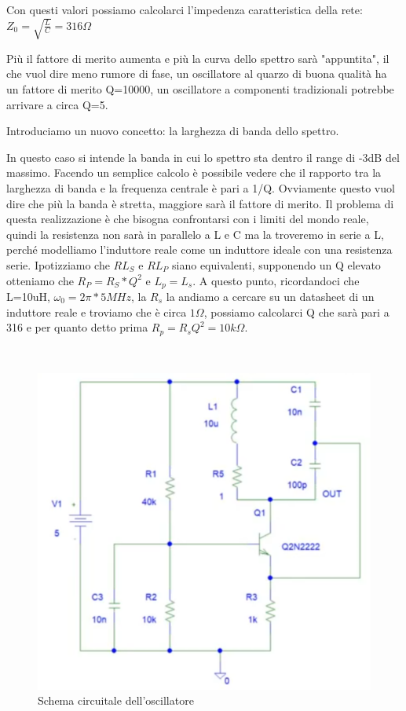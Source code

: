\documentclass{article}
\begin{document}
Con questi valori possiamo calcolarci l'impedenza caratteristica della rete:
\Large$Z_0=\sqrt{\frac{L}{C}}=316\Omega$\normalsize
\centering

Più il fattore di merito aumenta e più la curva dello spettro sarà "appuntita", il che vuol dire meno rumore di fase, un oscillatore al quarzo di buona qualità ha un fattore di merito Q=10000, un oscillatore a componenti tradizionali potrebbe arrivare a circa Q=5.

Introduciamo un nuovo concetto: la larghezza di banda dello spettro.

In questo caso si intende la banda in cui lo spettro sta dentro il range di -3dB del massimo.
Facendo un semplice calcolo è possibile vedere che il rapporto tra la larghezza di banda e la frequenza centrale è pari a 1/Q.
Ovviamente questo vuol dire che più la banda è stretta, maggiore sarà il fattore di merito.
Il problema di questa realizzazione è che bisogna confrontarsi con i limiti del mondo reale, quindi la resistenza non sarà in parallelo a L e C ma la troveremo in serie a L, perché modelliamo l'induttore reale come un induttore ideale con una resistenza serie.
Ipotizziamo che $RL_S$ e $RL_P$ siano equivalenti, supponendo un Q elevato otteniamo che $R_P=R_S*Q^2$  e $L_p=L_s$.
A questo punto, ricordandoci che L=10uH, $\omega_0=2\pi * 5MHz$, la $R_s$ la andiamo a cercare su un datasheet di un induttore reale e troviamo che è circa $1\Omega$, possiamo calcolarci Q che sarà pari a 316 e per quanto detto prima $R_p=R_sQ^2=10k\Omega$.


~\begin{figure}[H]
\includegraphics[scale=0.8]{Oscillatore.png}
\centering
\caption{Schema circuitale dell'oscillatore}
\label{fig:foo}
\end{figure}
\end{document}
